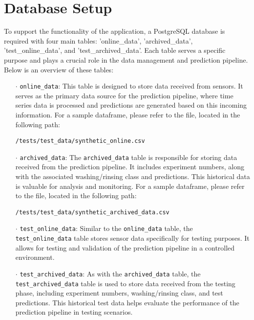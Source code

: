 \documentclass{report}
\begin{document}
\section{Database Setup}

To support the functionality of the application, a PostgreSQL database is required with four main tables: 'online\_data', 'archived\_data', 'test\_online\_data', and 'test\_archived\_data'. Each table serves a specific purpose and plays a crucial role in the data management and prediction pipeline. Below is an overview of these tables:

\begin{itemize}
  \item[$\cdot$] \texttt{online\_data}: This table is designed to store data received from sensors. It serves as the primary data source for the prediction pipeline, where time series data is processed and predictions are generated based on this incoming information. For a sample dataframe, please refer to the file, located in the following path: 
\begin{verbatim}
/tests/test_data/synthetic_online.csv
\end{verbatim}
  \item[$\cdot$] \texttt{archived\_data}: The \texttt{archived\_data} table is responsible for storing data received from the prediction pipeline. It includes experiment numbers, along with the associated washing/rinsing class and predictions. This historical data is valuable for analysis and monitoring. For a sample dataframe, please refer to the file, located in the following path:
\begin{verbatim}
/tests/test_data/synthetic_archived_data.csv
\end{verbatim}
  \item[$\cdot$] \texttt{test\_online\_data}: Similar to the \texttt{online\_data} table, the \texttt{test\_online\_data} table stores sensor data specifically for testing purposes. It allows for testing and validation of the prediction pipeline in a controlled environment.

  \item[$\cdot$] \texttt{test\_archived\_data}: As with the \texttt{archived\_data} table, the \texttt{test\_archived\_data} table is used to store data received from the testing phase, including experiment numbers, washing/rinsing class, and test predictions. This historical test data helps evaluate the performance of the prediction pipeline in testing scenarios.

\end{itemize}
\end{document}
